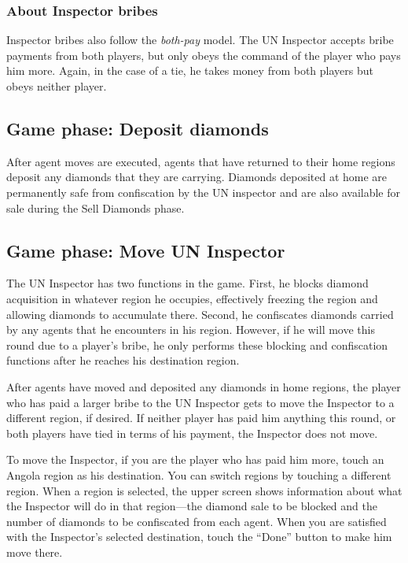 \documentclass[8pt]{extbook}
\begin{document}
\subsubsection{About Inspector bribes}
Inspector bribes also follow the {\it both-pay} model.  The UN Inspector accepts bribe payments from both players, but only obeys the command of the player who pays him more.  Again, in the case of a tie, he takes money from both players but obeys neither player.

\subsection{Game phase:  Deposit diamonds}
\label{sec:depositPhase}

After agent moves are executed, agents that have returned to their home regions deposit any diamonds that they are carrying.  Diamonds deposited at home are permanently safe from confiscation by the UN inspector and are also available for sale during the Sell Diamonds phase.

\subsection{Game phase:  Move UN Inspector}
\label{sec:inspectorPhase}

The UN Inspector has two functions in the game.  First, he blocks diamond acquisition in whatever region he occupies, effectively freezing the region and allowing diamonds to accumulate there.  Second, he confiscates diamonds carried by any agents that he encounters in his region.  However, if he will move this round due to a player's bribe, he only performs these blocking and confiscation functions after he reaches his destination region.

After agents have moved and deposited any diamonds in home regions, the player who has paid a larger bribe to the UN Inspector gets to move the Inspector to a different region, if desired.  If neither player has paid him anything this round, or both players have tied in terms of his payment, the Inspector does not move.

To move the Inspector, if you are the player who has paid him more, touch an Angola region as his destination.  You can switch regions by touching a different region.  When a region is selected, the upper screen shows information about what the Inspector will do in that region---the diamond sale to be blocked and the number of diamonds to be confiscated from each agent.  When you are satisfied with the Inspector's selected destination, touch the ``Done'' button to make him move there.
\end{document}
